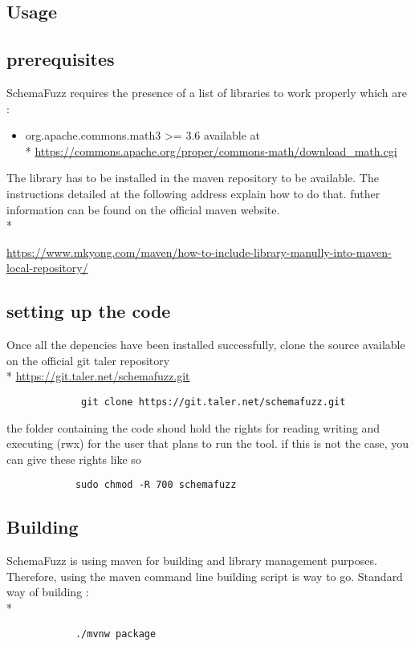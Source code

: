 \documentclass{article}
\begin{document}
\begin{empfile}
	\section{Usage}
		\subsection{prerequisites}
			SchemaFuzz requires the presence of a list of libraries to work properly which are :
			\begin{itemize}
			\item org.apache.commons.math3 >= 3.6
			available at \\*
			\url{https://commons.apache.org/proper/commons-math/download_math.cgi}			
			\end{itemize}
The library has to be installed in the maven repository to be available. The instructions detailed at the following address explain how to do that. futher information can be found on the official maven website.\\*

			\url{https://www.mkyong.com/maven/how-to-include-library-manully-into-maven-local-repository/}
			
		\subsection{setting up the code}
			Once all the depencies have been installed successfully, clone the source available on the official git taler repository \\*
			\url{https://git.taler.net/schemafuzz.git}
			\begin{verbatim}
			 git clone https://git.taler.net/schemafuzz.git
			\end{verbatim}
			
the folder containing the code shoud hold the rights for reading writing and executing (rwx) for the user that plans to run the tool.
if this is not the case, you can give these rights like so
			\begin{verbatim}
			sudo chmod -R 700 schemafuzz
			\end{verbatim}
		\subsection{Building}
SchemaFuzz is using maven for building and library management purposes.
Therefore, using the maven command line building script is way to go.
Standard way of building :\\*
			\begin{verbatim}
			./mvnw package
			\end{verbatim}
				

\end{empfile}
\end{document}
